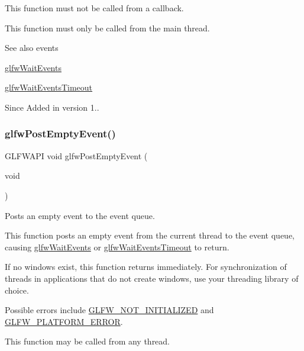 This function must not be called from a callback.

This function must only be called from the main thread.

\begin{DoxySeeAlso}{See also}
events 

\hyperlink{group__window_ga6e042d05823c11e11c7339b81a237738}{glfw\+Wait\+Events} 

\hyperlink{group__window_ga05223a0a4c5e50f10f289e60398153aa}{glfw\+Wait\+Events\+Timeout}
\end{DoxySeeAlso}
\begin{DoxySince}{Since}
Added in version 1.. 
\end{DoxySince}
\mbox{\label{group__window_gad6f6b997278c91c43b35970eb9713d7e}} 
\subsubsection{\texorpdfstring{glfw\+Post\+Empty\+Event()}{glfwPostEmptyEvent()}}
{\footnotesize\ttfamily G\+L\+F\+W\+A\+PI void glfw\+Post\+Empty\+Event (\begin{DoxyParamCaption}\item[{void}]{ }\end{DoxyParamCaption})}



Posts an empty event to the event queue. 

This function posts an empty event from the current thread to the event queue, causing \hyperlink{group__window_ga6e042d05823c11e11c7339b81a237738}{glfw\+Wait\+Events} or \hyperlink{group__window_ga05223a0a4c5e50f10f289e60398153aa}{glfw\+Wait\+Events\+Timeout} to return.

If no windows exist, this function returns immediately. For synchronization of threads in applications that do not create windows, use your threading library of choice.

Possible errors include \hyperlink{group__errors_ga2374ee02c177f12e1fa76ff3ed15e14a}{G\+L\+F\+W\+\_\+\+N\+O\+T\+\_\+\+I\+N\+I\+T\+I\+A\+L\+I\+Z\+ED} and \hyperlink{group__errors_gad44162d78100ea5e87cdd38426b8c7a1}{G\+L\+F\+W\+\_\+\+P\+L\+A\+T\+F\+O\+R\+M\+\_\+\+E\+R\+R\+OR}.

This function may be called from any thread.

